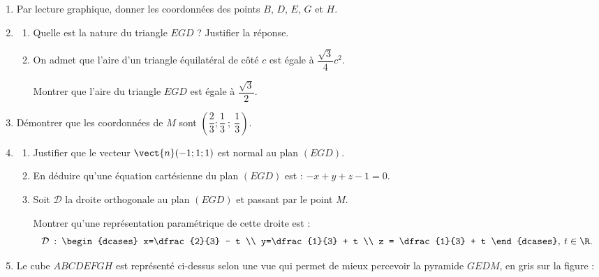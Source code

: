 \begin{enumerate}
	\item Par lecture graphique, donner les coordonnées des points $B$, $D$, $E$, $G$ et $H$.
	\item 
	\begin{enumerate}
		\item Quelle est la nature du triangle $EGD$ ? Justifier la réponse.
		\item On admet que l'aire d'un triangle équilatéral de côté $c$ est égale à $\dfrac{\sqrt{3}}{4}c^2$.
		
		Montrer que l'aire du triangle $EGD$ est égale à $\dfrac{\sqrt{3}}{2}$.
	\end{enumerate}
	\item Démontrer que les coordonnées de $M$ sont $\left(\dfrac{2}{3};\dfrac{1}{3}~; ~\dfrac{1}{3}\right)$.
	\item
	\begin{enumerate}
		\item Justifier que le vecteur $\vect{n}(-1;1;1)$ est normal au plan $(EGD)$.
		\item En déduire qu'une équation cartésienne du plan $(EGD)$ est : $- x + y + z - 1 = 0$.
		\item Soit $\mathcal{D}$ la droite orthogonale au plan $(EGD)$ et passant par le point $M$. 
		
		Montrer qu'une représentation paramétrique de cette droite est : \[ \mathcal{D} \: : \: \begin{dcases} x=\dfrac{2}{3} - t \\ y=\dfrac{1}{3} + t \\ z = \dfrac{1}{3} + t \end{dcases},\:t\in\R. \]
	\end{enumerate}
	\item Le cube $ABCDEFGH$ est représenté ci-dessus selon une vue qui permet de mieux percevoir la pyramide $GEDM$, en gris sur la figure :
	

\end{enumerate}

